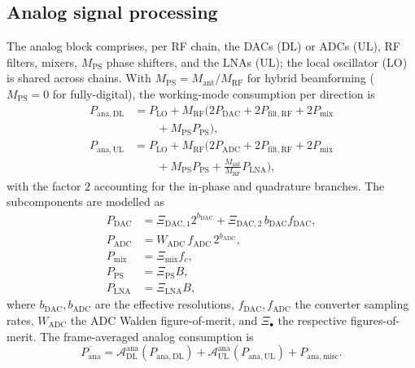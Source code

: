\subsection{Analog signal processing}
\label{sec:ana}
The analog block comprises, per RF chain, the DACs (DL) or ADCs (UL), RF
filters, mixers, $M_{\mathrm{PS}}$ phase shifters, and the LNAs (UL); the local
oscillator (LO) is shared across chains. With
$M_{\mathrm{PS}}=M_{\mathrm{ant}}/M_{\mathrm{RF}}$ for hybrid beamforming
($M_{\mathrm{PS}}=0$ for fully-digital), the working-mode consumption per
direction is
\begin{align}
\label{eq:ana_dl}
P_{\mathrm{ana,DL}} &= P_{\mathrm{LO}} + M_{\mathrm{RF}}\big(
2P_{\mathrm{DAC}} + 2P_{\mathrm{filt,RF}} + 2P_{\mathrm{mix}} \nonumber\\
&\qquad + M_{\mathrm{PS}}P_{\mathrm{PS}}\big),\\
\label{eq:ana_ul}
P_{\mathrm{ana,UL}} &= P_{\mathrm{LO}} + M_{\mathrm{RF}}\Big(
2P_{\mathrm{ADC}} + 2P_{\mathrm{filt,RF}} + 2P_{\mathrm{mix}} \nonumber\\
&\qquad + M_{\mathrm{PS}}P_{\mathrm{PS}}
+ \tfrac{M_{\mathrm{ant}}}{M_{\mathrm{RF}}}P_{\mathrm{LNA}}\Big),
\end{align}
with the factor $2$ accounting for the in-phase and quadrature branches. The
subcomponents are modelled as
\begin{align}
P_{\mathrm{DAC}} &= \Xi_{\mathrm{DAC},1}2^{b_{\mathrm{DAC}}}
+ \Xi_{\mathrm{DAC},2}\,b_{\mathrm{DAC}}f_{\mathrm{DAC}},\\
P_{\mathrm{ADC}} &= W_{\mathrm{ADC}}\,f_{\mathrm{ADC}}\,2^{b_{\mathrm{ADC}}},\\
P_{\mathrm{mix}} &= \Xi_{\mathrm{mix}}f_c,\\
P_{\mathrm{PS}} &= \Xi_{\mathrm{PS}}B,\\
P_{\mathrm{LNA}} &= \Xi_{\mathrm{LNA}}B,
\end{align}
where $b_{\mathrm{DAC}},b_{\mathrm{ADC}}$ are the effective resolutions,
$f_{\mathrm{DAC}},f_{\mathrm{ADC}}$ the converter sampling rates,
$W_{\mathrm{ADC}}$ the ADC Walden figure-of-merit, and $\Xi_\bullet$ the
respective figures-of-merit. The frame-averaged analog consumption is
\begin{equation}
\label{eq:ana_avg}
\overline{P_{\mathrm{ana}}} =
\mathcal{A}_{\mathrm{DL}}^{\mathrm{ana}}\!\left(P_{\mathrm{ana,DL}}\right)
+ \mathcal{A}_{\mathrm{UL}}^{\mathrm{ana}}\!\left(P_{\mathrm{ana,UL}}\right)
+ P_{\mathrm{ana,misc}} .
\end{equation}

